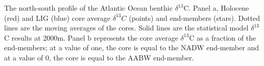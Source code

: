 The north-south profile of the Atlantic Ocean benthic $\delta^{13}$C. Panel a, Holocene (red) and LIG (blue) core average $\delta^{13}C$ (points) and end-members (stars). Dotted lines are the moving averages of the cores. Solid lines are the statistical model $\delta^{13}$C results at 2000m. Panel b represents the core average $\delta^{13}$C as a fraction of the end-members; at a value of one, the core is equal to the NADW end-member and at a value of 0, the core is equal to the AABW end-member.